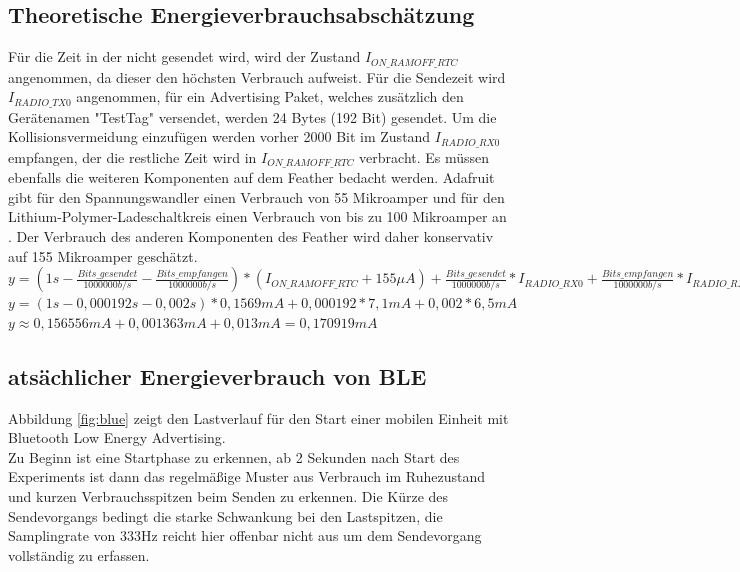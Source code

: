 \subsection{Theoretische Energieverbrauchsabschätzung}
Für die Zeit in der nicht gesendet wird, wird der Zustand $I_{ON\_RAMOFF\_RTC}$ angenommen, da dieser den höchsten Verbrauch aufweist.
Für die Sendezeit wird $I_{RADIO\_TX0}$ angenommen, für ein Advertising Paket, welches zusätzlich den Gerätenamen "{}TestTag"{} versendet, werden 24 Bytes (192 Bit) gesendet.
Um die Kollisionsvermeidung einzufügen werden vorher 2000 Bit im Zustand $I_{RADIO\_RX0}$ empfangen, der die restliche Zeit wird in $I_{ON\_RAMOFF\_RTC}$ verbracht. 
Es müssen ebenfalls die weiteren Komponenten auf dem Feather bedacht werden. 
Adafruit gibt für den Spannungswandler einen Verbrauch von 55 Mikroamper und für den Lithium-Polymer-Ladeschaltkreis einen Verbrauch von bis zu 100 Mikroamper an \cite{fried2016lora}. 
Der Verbrauch des anderen Komponenten des Feather wird daher konservativ auf 155 Mikroamper geschätzt.\\[1cm]

$y = (1s-\frac{Bits\_gesendet}{1000000 b/s} - \frac{Bits\_empfangen}{1000000 b/s}) * (I_{ON\_RAMOFF\_RTC} + 155 {\mu}A) + \frac{Bits\_gesendet}{1000000 b/s} * I_{RADIO\_RX0} + \frac{Bits\_empfangen}{1000000 b/s} * I_{RADIO\_RX0}$\\[0.5cm]
$y = (1s - 0,000192s - 0,002s) * 0,1569mA + 0,000192 * 7,1mA + 0,002 * 6,5mA$\\[0.5cm]
$y \approx 0,156556mA + 0,001363mA + 0,013mA = 0,170919mA$ \\[1cm]

\subsection{atsächlicher Energieverbrauch von BLE}
\label{ch:phase3:sec:powerble}
Abbildung \ref{fig:blue} zeigt den Lastverlauf für den Start einer mobilen Einheit mit Bluetooth Low Energy Advertising.\\
Zu Beginn ist eine Startphase zu erkennen, ab 2 Sekunden nach Start des Experiments ist dann das regelmäßige Muster aus Verbrauch im Ruhezustand und kurzen Verbrauchsspitzen beim Senden zu erkennen.
Die Kürze des Sendevorgangs bedingt die starke Schwankung bei den Lastspitzen, die Samplingrate von 333Hz reicht hier offenbar nicht aus um dem Sendevorgang vollständig zu erfassen.\\

